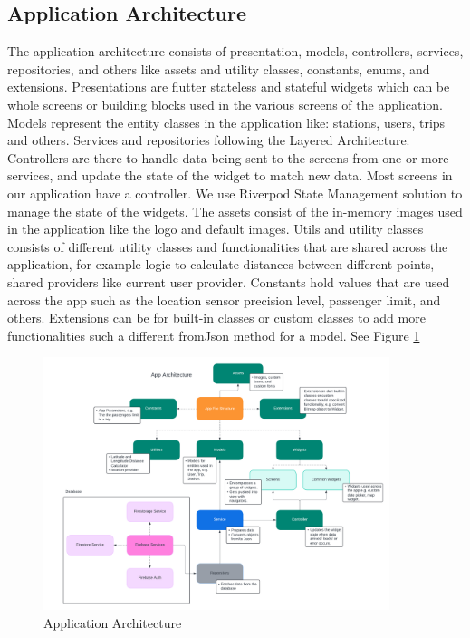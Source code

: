 \documentclass[a4paper, 12pt]{report} %
\begin{document}
            \subsection{Application Architecture}
                The application architecture consists of presentation, models, controllers, services, repositories, and others like assets and utility classes, constants, enums, and extensions. Presentations are flutter stateless and stateful widgets which can be whole screens or building blocks used in the various screens of the application. Models represent the entity classes in the application like: stations, users, trips and others. Services and repositories following the Layered Architecture. Controllers are there to handle data being sent to the screens from one or more services, and update the state of the widget to match new data. Most screens in our application have a controller. We use Riverpod State Management solution to manage the state of the widgets. The assets consist of the in-memory images used in the application like the logo and default images. Utils and utility classes consists of different utility classes and functionalities that are shared across the application, for example logic to calculate distances between different points, shared providers like current user provider. Constants hold values that are used across the app such as the location sensor precision level, passenger limit, and others. Extensions can be for built-in classes or custom classes to add more functionalities such a different fromJson method for a model. See Figure \ref{fig:app_architecture}

        \begin{figure}
                    \centering
                    \includegraphics[width=0.9\textwidth]{Images/app_arch.png}
                    \caption{Application Architecture}
                    \label{fig:app_architecture}
        \end{figure}
\end{document}
